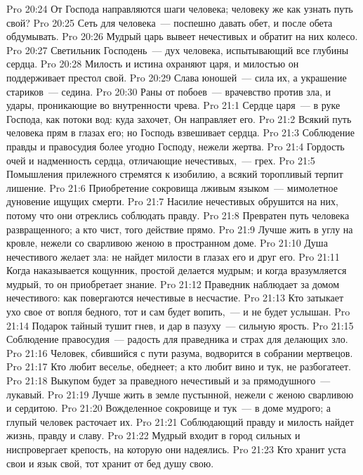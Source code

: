 \vs Pro 20:24 От Господа направляются шаги человека; человеку же как узнать путь свой?
\vs Pro 20:25 Сеть для человека~--- поспешно давать обет, и после обета обдумывать.
\vs Pro 20:26 Мудрый царь вывеет нечестивых и обратит на них колесо.
\vs Pro 20:27 Светильник Господень~--- дух человека, испытывающий все глубины сердца.
\vs Pro 20:28 Милость и истина охраняют царя, и милостью он поддерживает престол свой.
\vs Pro 20:29 Слава юношей~--- сила их, а украшение стариков~--- седина.
\vs Pro 20:30 Раны от побоев~--- врачевство против зла, и удары, проникающие во внутренности чрева.
\vs Pro 21:1 Сердце царя~--- в руке Господа, как потоки вод: куда захочет, Он направляет его.
\vs Pro 21:2 Всякий путь человека прям в глазах его; но Господь взвешивает сердца.
\vs Pro 21:3 Соблюдение правды и правосудия более угодно Господу, нежели жертва.
\vs Pro 21:4 Гордость очей и надменность сердца, отличающие нечестивых,~--- грех.
\vs Pro 21:5 Помышления прилежного стремятся к изобилию, а всякий торопливый терпит лишение.
\vs Pro 21:6 Приобретение сокровища лживым языком~--- мимолетное дуновение ищущих смерти.
\vs Pro 21:7 Насилие нечестивых обрушится на них, потому что они отреклись соблюдать правду.
\vs Pro 21:8 Превратен путь человека развращенного; а кто чист, того действие прямо.
\vs Pro 21:9 Лучше жить в углу на кровле, нежели со сварливою женою в пространном доме.
\vs Pro 21:10 Душа нечестивого желает зла: не найдет милости в глазах его и друг его.
\vs Pro 21:11 Когда наказывается кощунник, простой делается мудрым; и когда вразумляется мудрый, то он приобретает знание.
\vs Pro 21:12 Праведник наблюдает за домом нечестивого: как повергаются нечестивые в несчастие.
\vs Pro 21:13 Кто затыкает ухо свое от вопля бедного, тот и сам будет вопить,~--- и не будет услышан.
\vs Pro 21:14 Подарок тайный тушит гнев, и дар в пазуху~--- сильную ярость.
\vs Pro 21:15 Соблюдение правосудия~--- радость для праведника и страх для делающих зло.
\vs Pro 21:16 Человек, сбившийся с пути разума, водворится в собрании мертвецов.
\vs Pro 21:17 Кто любит веселье, обеднеет; а кто любит вино и тук, не разбогатеет.
\vs Pro 21:18 Выкупом будет за праведного нечестивый и за прямодушного~--- лукавый.
\vs Pro 21:19 Лучше жить в земле пустынной, нежели с женою сварливою и сердитою.
\vs Pro 21:20 Вожделенное сокровище и тук~--- в доме мудрого; а глупый человек расточает их.
\vs Pro 21:21 Соблюдающий правду и милость найдет жизнь, правду и славу.
\vs Pro 21:22 Мудрый входит в город сильных и ниспровергает крепость, на которую они надеялись.
\vs Pro 21:23 Кто хранит уста свои и язык свой, тот хранит от бед душу свою.
